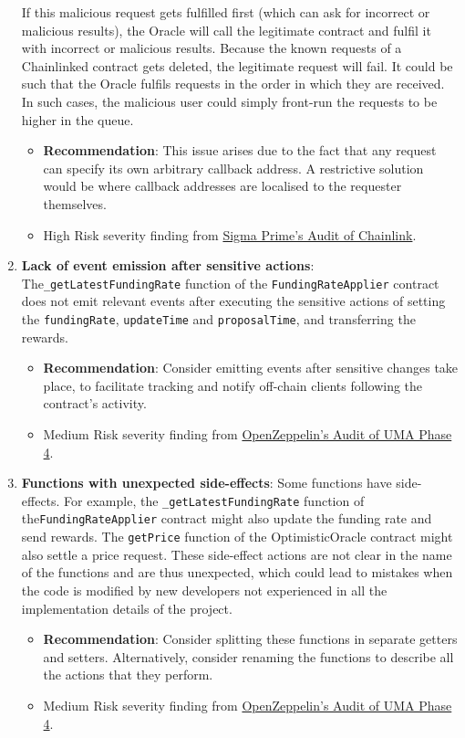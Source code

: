 \begin{enumerate}
If this malicious request gets fulfilled first (which can ask for incorrect or malicious results), the Oracle will call the legitimate contract and fulfil it with incorrect or malicious results. Because the known requests of a Chainlinked contract gets deleted, the legitimate request will fail. It could be such that the Oracle fulfils requests in the order in which they are received. In such cases, the malicious user could simply front-run the requests to be higher in the queue.
	\begin{itemize}
	\item\textbf{Recommendation}: This issue arises due to the fact that any request can specify its own arbitrary callback address. A restrictive solution would be where callback addresses are localised to the requester themselves.
	\item High Risk severity finding from \href{https://github.com/sigp/public-audits/blob/master/chainlink-1/review.pdf}{Sigma Prime's Audit of Chainlink}.
	\end{itemize}

\item\textbf{Lack of event emission after sensitive actions}: The\linebreak\verb|_getLatestFundingRate| function of the \verb|FundingRateApplier| contract does not emit relevant events after executing the sensitive actions of setting the \verb|fundingRate|, \verb|updateTime| and \verb|proposalTime|, and transferring the rewards.
	\begin{itemize}
	\item\textbf{Recommendation}: Consider emitting events after sensitive changes take place, to facilitate tracking and notify off-chain clients following the contract’s activity.
	\item Medium Risk severity finding from \href{https://blog.openzeppelin.com/uma-audit-phase-4/}{OpenZeppelin’s Audit of UMA Phase 4}.
	\end{itemize}

\item\textbf{Functions with unexpected side-effects}: Some functions have side-effects. For example, the \verb|_getLatestFundingRate| function of the\linebreak\verb|FundingRateApplier| contract might also update the funding rate and send rewards. The \verb|getPrice| function of the OptimisticOracle contract might also settle a price request. These side-effect actions are not clear in the name of the functions and are thus unexpected, which could lead to mistakes when the code is modified by new developers not experienced in all the implementation details of the project.
	\begin{itemize}
	\item\textbf{Recommendation}: Consider splitting these functions in separate getters and setters. Alternatively, consider renaming the functions to describe all the actions that they perform.
	\item Medium Risk severity finding from \href{https://blog.openzeppelin.com/uma-audit-phase-4/}{OpenZeppelin’s Audit of UMA Phase 4}.
	\end{itemize}


\end{enumerate}
